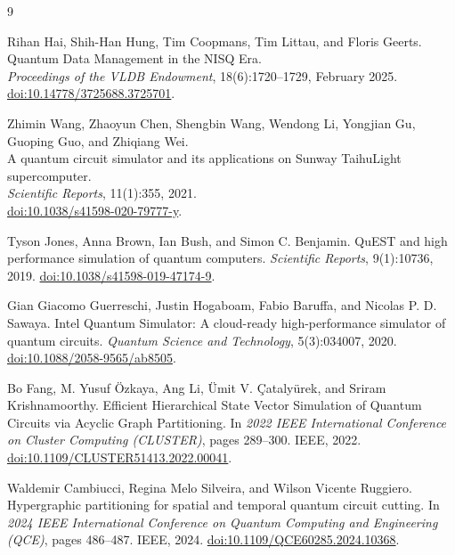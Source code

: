 
\begin{thebibliography}{9}

Rihan Hai, Shih-Han Hung, Tim Coopmans, Tim Littau, and Floris Geerts.\\
\newblock Quantum Data Management in the NISQ Era.\\
\newblock \emph{Proceedings of the VLDB Endowment}, 18(6):1720--1729, February 2025.\\
\newblock \href{https://doi.org/10.14778/3725688.3725701}{doi:10.14778/3725688.3725701}.

Zhimin Wang, Zhaoyun Chen, Shengbin Wang, Wendong Li, Yongjian Gu, Guoping Guo, and Zhiqiang Wei.\\
\newblock A quantum circuit simulator and its applications on Sunway TaihuLight supercomputer.\\
\newblock \emph{Scientific Reports}, 11(1):355, 2021.\\
\newblock \href{https://doi.org/10.1038/s41598-020-79777-y}{doi:10.1038/s41598-020-79777-y}.

Tyson Jones, Anna Brown, Ian Bush, and Simon C. Benjamin.
\newblock QuEST and high performance simulation of quantum computers.
\newblock \emph{Scientific Reports}, 9(1):10736, 2019.
\newblock \href{https://doi.org/10.1038/s41598-019-47174-9}{doi:10.1038/s41598-019-47174-9}.

Gian Giacomo Guerreschi, Justin Hogaboam, Fabio Baruffa, and Nicolas P. D. Sawaya.
\newblock Intel Quantum Simulator: A cloud-ready high-performance simulator of quantum circuits.
\newblock \emph{Quantum Science and Technology}, 5(3):034007, 2020.
\newblock \href{https://doi.org/10.1088/2058-9565/ab8505}{doi:10.1088/2058-9565/ab8505}.

Bo Fang, M. Yusuf \"{O}zkaya, Ang Li, \"{U}mit V. \c{C}ataly\"{u}rek, and Sriram Krishnamoorthy.
\newblock Efficient Hierarchical State Vector Simulation of Quantum Circuits via Acyclic Graph Partitioning.
\newblock In \emph{2022 IEEE International Conference on Cluster Computing (CLUSTER)}, pages 289--300. IEEE, 2022.
\newblock \href{https://doi.org/10.1109/CLUSTER51413.2022.00041}{doi:10.1109/CLUSTER51413.2022.00041}.

Waldemir Cambiucci, Regina Melo Silveira, and Wilson Vicente Ruggiero.
\newblock Hypergraphic partitioning for spatial and temporal quantum circuit cutting.
\newblock In \emph{2024 IEEE International Conference on Quantum Computing and Engineering (QCE)}, pages 486--487. IEEE, 2024.
\newblock \href{https://doi.org/10.1109/QCE60285.2024.10368}{doi:10.1109/QCE60285.2024.10368}.


\end{thebibliography}
